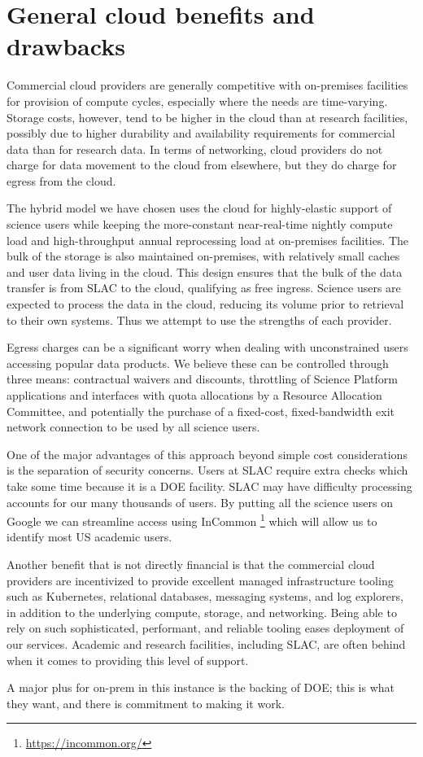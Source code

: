\section{General cloud benefits and drawbacks} \label{sec:tradeoffs}

Commercial cloud providers are generally competitive with on-premises facilities for provision of compute cycles, especially where the needs are time-varying.
Storage costs, however, tend to be higher in the cloud than at research facilities, possibly due to higher durability and availability requirements for commercial data than for research data.
In terms of networking, cloud providers do not charge for data movement to the cloud from elsewhere, but they do charge for egress from the cloud.

The hybrid model we have chosen uses the cloud for highly-elastic support of science users while keeping the more-constant near-real-time nightly compute load and high-throughput annual reprocessing load at on-premises facilities.
The bulk of the storage is also maintained on-premises, with relatively small caches and user data living in the cloud.
This design ensures that the bulk of the data transfer is from SLAC to the cloud, qualifying as free ingress.
Science users are expected to process the data in the cloud, reducing its volume prior to retrieval to their own systems.
Thus we attempt to use the strengths of each provider.

Egress charges can be a significant worry when dealing with unconstrained users accessing popular data products.
We believe these can be controlled through three means: contractual waivers and discounts, throttling of Science Platform applications and interfaces with quota allocations by a Resource Allocation Committee, and potentially the purchase of a fixed-cost, fixed-bandwidth exit network connection to be used by all science users.

One of the major advantages of this approach beyond simple cost considerations is the separation of security concerns.
Users at SLAC require extra checks which take some time because it is a DOE facility.
SLAC may have difficulty processing accounts for our many thousands of users.
By putting all the science users on Google we can streamline access using InCommon \footnote{\url{https://incommon.org/}} which will allow us to identify most US academic users.

Another benefit that is not directly financial is that the commercial cloud providers are incentivized to provide excellent managed infrastructure tooling such as Kubernetes, relational databases, messaging systems, and log explorers, in addition to the underlying compute, storage, and networking.
Being able to rely on such sophisticated, performant, and reliable tooling eases deployment of our services.
Academic and research facilities, including SLAC, are often behind when it comes to providing this level of support.

A major plus for on-prem in this instance is the backing of DOE; this is what they want, and there is commitment to making it work.
